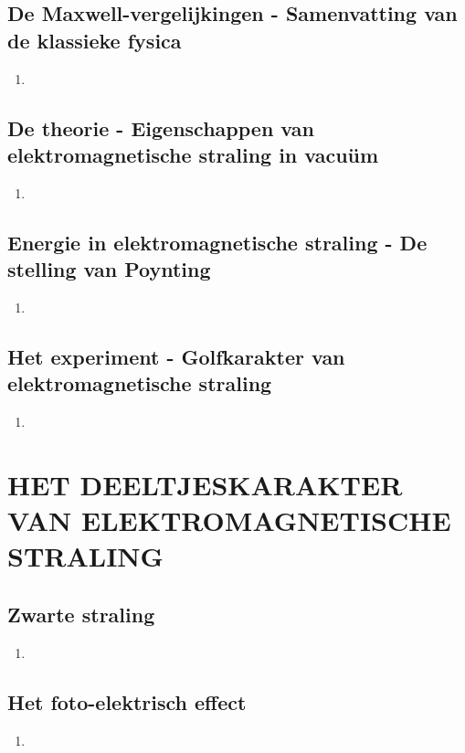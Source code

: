 \documentclass[12pt]{article}
\begin{document}
    \subsection{De Maxwell-vergelijkingen - Samenvatting van de klassieke fysica}
    \begin{enumerate}
        \item 
    \end{enumerate}
    \subsection{De theorie - Eigenschappen van elektromagnetische straling in vacuüm}
    \begin{enumerate}
        \item 
    \end{enumerate}
    \subsection{Energie in elektromagnetische straling - De stelling van Poynting}
    \begin{enumerate}
        \item 
    \end{enumerate}
    \subsection{Het experiment - Golfkarakter van elektromagnetische straling}
    \begin{enumerate}
        \item 
    \end{enumerate}



    \section{HET DEELTJESKARAKTER VAN ELEKTROMAGNETISCHE STRALING}
    \subsection{Zwarte straling}
    \begin{enumerate}
        \item 
    \end{enumerate}
    \subsection{Het foto-elektrisch effect}
    \begin{enumerate}
        \item 
    \end{enumerate}
\end{document}
